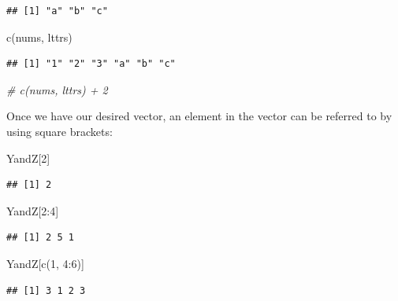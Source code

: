 \documentclass[
]{book}
\newenvironment{Shaded}{\begin{snugshade}}{\end{snugshade}}
\newcommand{\CommentTok}[1]{\textcolor[rgb]{0.56,0.35,0.01}{\textit{#1}}}
\newcommand{\DecValTok}[1]{\textcolor[rgb]{0.00,0.00,0.81}{#1}}
\newcommand{\FunctionTok}[1]{\textcolor[rgb]{0.00,0.00,0.00}{#1}}
\newcommand{\NormalTok}[1]{#1}
\newcommand{\SpecialCharTok}[1]{\textcolor[rgb]{0.00,0.00,0.00}{#1}}
\begin{document}
\begin{verbatim}
## [1] "a" "b" "c"
\end{verbatim}

\begin{Shaded}
\begin{Highlighting}[]
\FunctionTok{c}\NormalTok{(nums, lttrs)}
\end{Highlighting}
\end{Shaded}

\begin{verbatim}
## [1] "1" "2" "3" "a" "b" "c"
\end{verbatim}

\begin{Shaded}
\begin{Highlighting}[]
\CommentTok{\# c(nums, lttrs) + 2}
\end{Highlighting}
\end{Shaded}

Once we have our desired vector, an element in the vector can be referred to by using square brackets:

\begin{Shaded}
\begin{Highlighting}[]
\NormalTok{YandZ[}\DecValTok{2}\NormalTok{]}
\end{Highlighting}
\end{Shaded}

\begin{verbatim}
## [1] 2
\end{verbatim}

\begin{Shaded}
\begin{Highlighting}[]
\NormalTok{YandZ[}\DecValTok{2}\SpecialCharTok{:}\DecValTok{4}\NormalTok{]}
\end{Highlighting}
\end{Shaded}

\begin{verbatim}
## [1] 2 5 1
\end{verbatim}

\begin{Shaded}
\begin{Highlighting}[]
\NormalTok{YandZ[}\FunctionTok{c}\NormalTok{(}\DecValTok{1}\NormalTok{, }\DecValTok{4}\SpecialCharTok{:}\DecValTok{6}\NormalTok{)]}
\end{Highlighting}
\end{Shaded}

\begin{verbatim}
## [1] 3 1 2 3
\end{verbatim}
\end{document}
